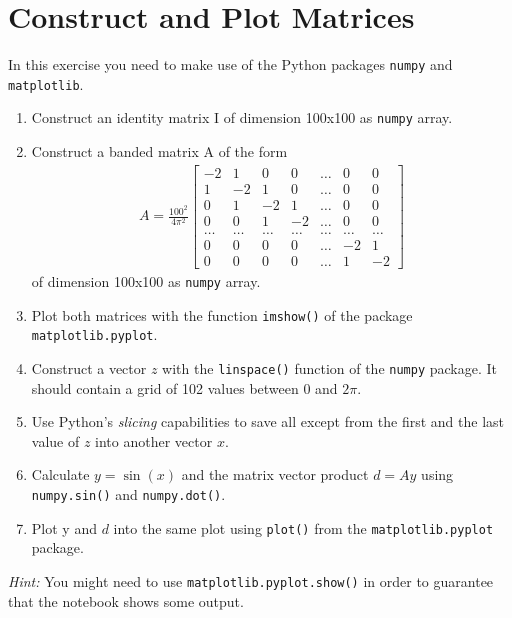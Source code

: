 \section{Construct and Plot Matrices}
In this exercise you need to make use of the Python packages \verb|numpy| and \verb|matplotlib|.
	\begin{enumerate}
		\item Construct an identity matrix I of dimension 100x100 as \verb|numpy| array.
		\item Construct a banded matrix A of the form 
		\begin{align*}
						A = 	\frac{100^2}{4 \pi^2} \begin{bmatrix}
								-2&1 &0 &0&\dots&0&0\\
								 1&-2&1 &0&\dots&0&0\\
								 0&1&-2 &1&\dots&0&0\\
								 0&0&1 &-2&\dots&0&0\\
								 \dots &\dots   &\dots  & \dots&\dots&\dots &\dots\\
								 0& 0&0 &0&\dots&-2&1\\
								 0& 0&0 &0&\dots&1&-2     
							\end{bmatrix} 
		\end{align*}
		of dimension 100x100 as \verb|numpy| array.
		\item Plot both matrices with the function \verb|imshow()| of the package \verb|matplotlib.pyplot|. 
		\item Construct a vector $z$ with the \verb|linspace()| function of the \verb|numpy| package. It should contain a grid of 102 values between 0 and $2\pi$. 
		\item Use Python's \textit{slicing} capabilities to save all except from the first and the last value of $z$ into another vector $x$.
		\item Calculate $y = \sin(x)$ and the matrix vector product $d = Ay$ using \verb|numpy.sin()| and \verb|numpy.dot()|.
		\item Plot y and $d$ into the same plot using \verb|plot()| from the \verb|matplotlib.pyplot| package.
 	\end{enumerate}
 	\textit{Hint:} You might need to use \verb|matplotlib.pyplot.show()| in order to guarantee that the notebook shows some output.